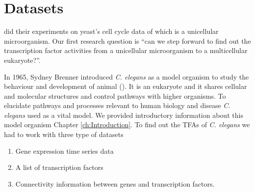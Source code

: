 \section{Datasets}
\cite{Sanguinetti:2006} did their experiments on yeast's cell cycle data of \cite{Spellman:1998} which is a unicellular microorganism. Our first research question is ``can we step forward to find out the transcription factor activities from a unicellular microorganism to a multicellular eukaryote?''. 

In 1965, Sydney Brenner introduced \textit{C. elegans} as a model organism to study the behaviour and development of animal (\cite{Brenner:1974}). It is an eukaryote and it shares cellular and molecular structures and control pathways with higher organisms. To elucidate pathways and processes relevant to human biology and disease \textit{C. elegans} used as a vital model. We provided introductory information about this model organism Chapter \ref{ch:Introduction}. To find out the TFAs of \textit{C. elegans} we had to work with three type of datasets
\begin{enumerate}
 \item Gene expression time series data 
 \item A list of transcription factors 
 \item Connectivity information between genes and transcription factors.
\end{enumerate}


